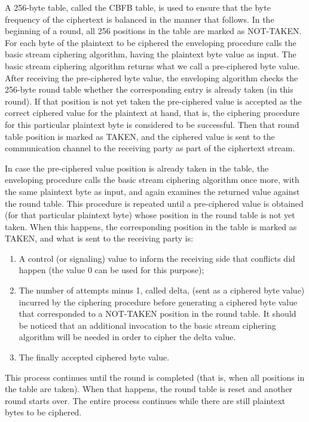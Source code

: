 \documentclass[conference]{IEEEtran}
\begin{document}
A 256-byte table, called the CBFB table, is used to ensure that the byte frequency of the ciphertext is balanced in the manner that follows. In the beginning of a round, all 256 positions in the table are marked as NOT-TAKEN. For each byte of the plaintext to be ciphered the enveloping procedure calls the basic stream ciphering algorithm, having the plaintext byte value as input. The basic stream ciphering algorithm returns what we call a pre-ciphered byte value. After receiving the pre-ciphered byte value, the enveloping algorithm checks the 256-byte round table whether the corresponding entry is already taken (in this round). If that position is not yet taken the pre-ciphered value is accepted as the correct ciphered value for the plaintext at hand, that is, the ciphering procedure for this particular plaintext byte is considered to be successful. Then that round table position is marked as TAKEN, and the ciphered value is sent to the communication channel to the receiving party as part of the ciphertext stream. 

In case the pre-ciphered value position is already taken in the table, the enveloping procedure calls the basic stream ciphering algorithm once more, with the same plaintext byte as input, and again examines the returned value against the round table. This procedure is repeated until a pre-ciphered value is obtained (for that particular plaintext byte) whose position in the round table is not yet taken. When this happens, the corresponding position in the table is marked as TAKEN, and what is sent to the receiving party is:

\begin{enumerate}
	\item A control (or signaling) value to inform the receiving side that conflicts did happen (the value 0 can be used for this purpose); 
	\item The number of attempts minus 1, called delta, (sent as a ciphered byte value) incurred by the ciphering procedure before generating a ciphered byte value that corresponded to a NOT-TAKEN position in the round table. It should be noticed that an additional invocation to the basic stream ciphering algorithm will be needed in order to cipher the delta value.
	\item The finally accepted ciphered byte value. 
\end{enumerate}

This process continues until the round is completed (that is, when all positions in the table are taken). When that happens, the round table is reset and another round starts over. The entire process continues while there are still plaintext bytes to be ciphered.
\end{document}
